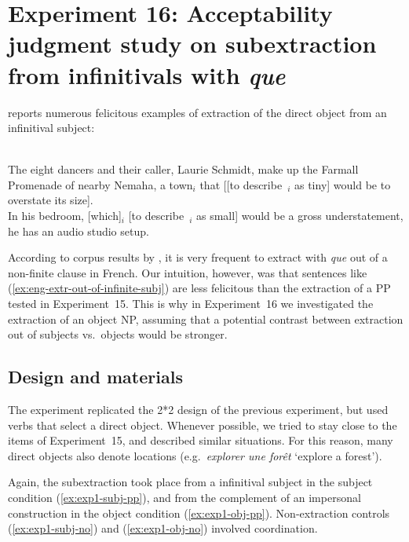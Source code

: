 \section[head=Experiment 16]{Experiment 16: Acceptability judgment study on subextraction from infinitivals with \emph{que}}
\label{ch:exp16}

\citet{Chaves.2013} reports numerous felicitous examples of extraction of the direct object from an infinitival subject:

\eal\label{ex:eng-extr-out-of-infinite-subj}
\ex \citep[1094, fn.\ 27]{Huddleston.2002}\\
The eight dancers and their caller, Laurie Schmidt, make up the
Farmall Promenade of nearby Nemaha, a town$_i$ that [[to describe~\trace{}$_i$
as tiny] would be to overstate its size].
\ex \citep[471]{Chaves.2013}\\
In his bedroom, [which]$_i$ [to describe~\trace{}$_i$ as small] would be a gross
understatement, he has an audio studio setup.
\zl 

According to corpus results by \citet{Candito.2012.ldd}, it is very frequent to extract with \emph{que} out of a non-finite clause in French. Our intuition, however, was that sentences like (\ref{ex:eng-extr-out-of-infinite-subj}) are less felicitous than the extraction of a PP tested in Experiment~15. This is why in Experiment~16 we investigated the extraction of an object NP, assuming that a potential contrast between extraction out of subjects vs.\ objects would be stronger.

\subsection{Design and materials}

The experiment replicated the 2*2 design of the previous experiment, but used verbs that select a direct object. Whenever possible, we tried to stay close to the items of Experiment~15, and described similar situations. For this reason, many direct objects also denote locations (e.g.\ \emph{explorer une forêt} `explore a forest').

Again, the subextraction took place from a infinitival subject in the subject condition (\ref{ex:exp1-subj-pp}), and from the complement of an impersonal construction in the object condition (\ref{ex:exp1-obj-pp}). Non-extraction controls (\ref{ex:exp1-subj-no}) and (\ref{ex:exp1-obj-no}) involved coordination. 

